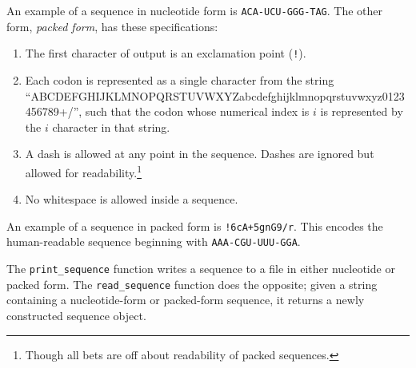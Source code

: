 \documentclass{article}
\begin{document}
	An example of a sequence in nucleotide form is \verb|ACA-UCU-GGG-TAG|.
	The other form, {\em packed form}, has these specifications:

	\begin{enumerate}
	  \item The first character of output is an exclamation point
	  (\verb|!|).

	  \item Each codon is represented as a single character from the string
	  ``ABCDEFGHIJKLMNOPQRSTUVWXYZabcdefghijklmnopqrstuvwxyz0123456789+/'',
	  such that the codon whose numerical index is $i$ is represented by the
	  $i$ character in that string.

	  \item A dash is allowed at any point in the sequence. Dashes are
	  ignored but allowed for readability.\footnote{Though all bets are off
	  about readability of packed sequences.}

	  \item No whitespace is allowed inside a sequence.
	\end{enumerate}

	An example of a sequence in packed form is \verb|!6cA+5gnG9/r|. This
	encodes the human-readable sequence beginning with \verb|AAA-CGU-UUU-GGA|.

	The \verb|print_sequence| function writes a sequence to a file in either
	nucleotide or packed form. The \verb|read_sequence| function does the
	opposite; given a string containing a nucleotide-form or packed-form
	sequence, it returns a newly constructed sequence object.
\end{document}
